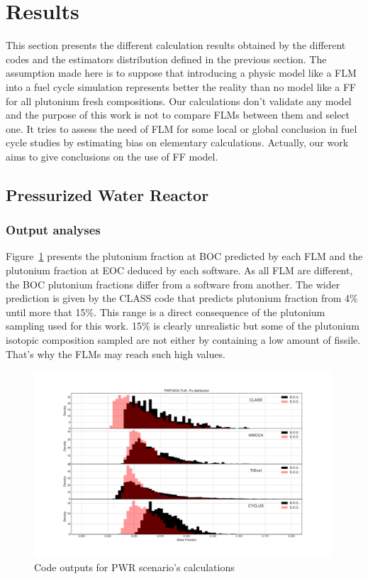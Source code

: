 
\section{Results}

This section presents the different calculation results obtained by the
different codes and the estimators distribution defined in the previous section.
The assumption made here is to suppose that introducing a physic model like a
FLM into a fuel cycle simulation represents better the reality than no model
like a FF for all plutonium fresh compositions. Our calculations don't validate
any model and the purpose of this work is not to compare FLMs between them and
select one. It tries to assess the need of FLM for some local or global
conclusion in fuel cycle studies by estimating bias on elementary calculations.
Actually, our work aims to give conclusions on the use of FF model.   

\subsection{Pressurized Water Reactor}
\subsubsection{Output analyses}

Figure~\ref{fig:PWR_MOX_FLM_Pu} presents the plutonium fraction at BOC predicted
by each FLM and the plutonium fraction at EOC deduced by each software. As all
FLM are different, the BOC plutonium fractions differ from a software from
another. The wider prediction is given by the CLASS code that predicts plutonium
fraction from 4\% until more that 15\%. This range is a direct consequence of
the plutonium sampling used for this work. 15\% is clearly unrealistic but some
of the plutonium isotopic composition sampled are not either by containing a low
amount of fissile. That's why the FLMs may reach such high values.    

\begin{figure}[h]
	\begin{center}
		\includegraphics[width = 0.99\textwidth]{../../Feature_1/RAW_DATA/FIG/PWR_MOX_FLM_Pu.pdf}
		\caption{Code outputs for PWR scenario's calculations}
		\label{fig:PWR_MOX_FLM_Pu}
	\end{center}
\end{figure}

